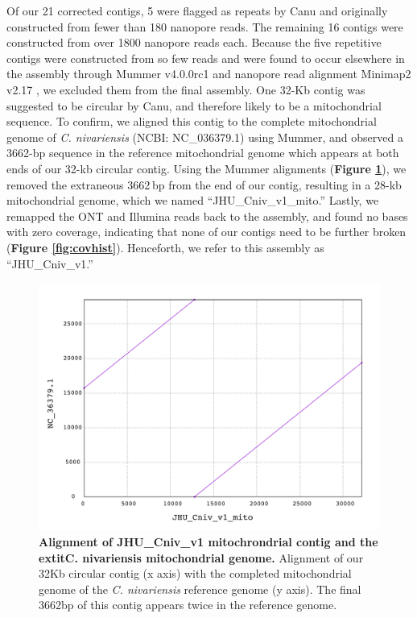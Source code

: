 Of our 21 corrected contigs, 5 were flagged as repeats by Canu and originally constructed from fewer than 180 nanopore reads. The remaining 16 contigs were constructed from over 1800 nanopore reads each. Because the five repetitive contigs were constructed from so few reads and were found to occur elsewhere in the assembly through Mummer v4.0.0rc1 \citep{Marcais2018-mm} and nanopore read alignment Minimap2 v2.17 \citep{Li2018-eq}, we excluded them from the final assembly. One 32-Kb contig was suggested to be circular by Canu, and therefore likely to be a mitochondrial sequence. To confirm, we aligned this contig to the complete mitochondrial genome of \textit{C. nivariensis} (NCBI: NC\_036379.1) using Mummer, and observed a 3662-bp sequence in the reference mitochondrial genome which appears at both ends of our 32-kb circular contig. Using the Mummer alignments ({\bf Figure \ref{fig:mito}}), we removed the extraneous 3662 bp from the end of our contig, resulting in a 28-kb mitochondrial genome, which we named “JHU\_Cniv\_v1\_mito.” Lastly, we remapped the ONT and Illumina reads back to the assembly, and found no bases with zero coverage, indicating that none of our contigs need to be further broken ({\bf Figure \ref{fig:covhist}}). Henceforth, we refer to this assembly as “JHU\_Cniv\_v1.”

\begin{figure}[!ht]
\centering
\includegraphics[width = 1\linewidth,keepaspectratio]{figure/mito.pdf}
\caption[Alignment of JHU\_Cniv\_v1 mitochrondrial contig and the 	extit{C. nivariensis} mitochondrial genome]{{\bf Alignment of JHU\_Cniv\_v1 mitochrondrial contig and the 	extit{C. nivariensis} mitochondrial genome.} Alignment of our 32Kb circular contig (x axis) with the completed mitochondrial genome of the \textit{C. nivariensis} reference genome (y axis). The final 3662bp of this contig appears twice in the reference genome. }
\label{fig:mito}
\end{figure}


